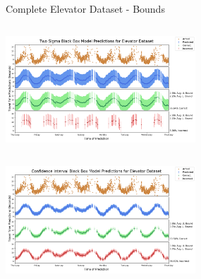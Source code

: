 \documentclass{beamer}
\begin{document}
\begin{frame}[t]{Complete Elevator Dataset - Bounds}

  \vspace*{-0.9cm}
  \begin{columns}[t]
    {\includegraphics[width = 2.8in]{images/elevator/two_sigma_black_box_model_predictions_for_elevator_dataset.png}}

    \begin{overlayarea}{0.5\textwidth}{0.5\textheight}


    \end{overlayarea}
  \end{columns}
  \vspace*{-0.3cm}

  \begin{columns}[t]

    {\includegraphics[width = 2.8in]{images/elevator/confidence_interval_black_box_model_predictions_for_elevator_dataset.png}}
  \end{columns}

\end{frame}
\end{document}
